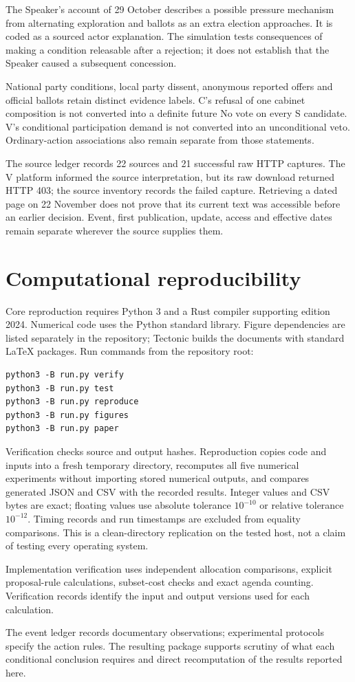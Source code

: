 The Speaker's account of 29 October describes a possible pressure mechanism from alternating exploration and ballots as an extra election approaches. It is coded as a sourced actor explanation. The simulation tests consequences of making a condition releasable after a rejection; it does not establish that the Speaker caused a subsequent concession.

National party conditions, local party dissent, anonymous reported offers and official ballots retain distinct evidence labels. C's refusal of one cabinet composition is not converted into a definite future No vote on every S candidate. V's conditional participation demand is not converted into an unconditional veto. Ordinary-action associations also remain separate from those statements.

The source ledger records 22 sources and 21 successful raw HTTP captures. The V platform informed the source interpretation, but its raw download returned HTTP 403; the source inventory records the failed capture. Retrieving a dated page on 22 November does not prove that its current text was accessible before an earlier decision. Event, first publication, update, access and effective dates remain separate wherever the source supplies them.

\section{Computational reproducibility}

Core reproduction requires Python 3 and a Rust compiler supporting edition 2024. Numerical code uses the Python standard library. Figure dependencies are listed separately in the repository; Tectonic builds the documents with standard LaTeX packages. Run commands from the repository root:
\begin{verbatim}
python3 -B run.py verify
python3 -B run.py test
python3 -B run.py reproduce
python3 -B run.py figures
python3 -B run.py paper
\end{verbatim}

Verification checks source and output hashes. Reproduction copies code and inputs into a fresh temporary directory, recomputes all five numerical experiments without importing stored numerical outputs, and compares generated JSON and CSV with the recorded results. Integer values and CSV bytes are exact; floating values use absolute tolerance \(10^{-10}\) or relative tolerance \(10^{-12}\). Timing records and run timestamps are excluded from equality comparisons. This is a clean-directory replication on the tested host, not a claim of testing every operating system.

Implementation verification uses independent allocation comparisons, explicit proposal-rule calculations, subset-cost checks and exact agenda counting. Verification records identify the input and output versions used for each calculation.

The event ledger records documentary observations; experimental protocols specify the action rules. The resulting package supports scrutiny of what each conditional conclusion requires and direct recomputation of the results reported here.
